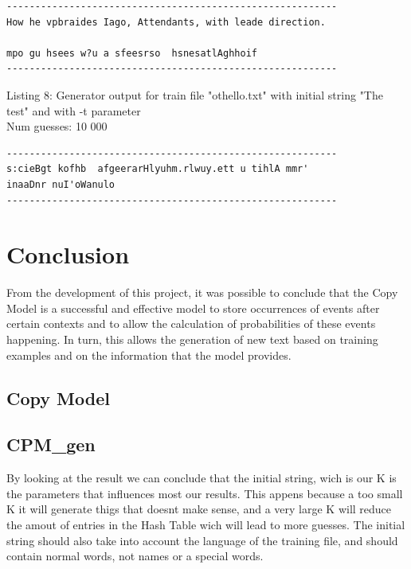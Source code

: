 \documentclass{article}
\begin{document}
\begin{lstlisting}
----------------------------------------------------------
How he vpbraides Iago, Attendants, with leade direction.

mpo gu hsees w?u a sfeesrso  hsnesatlAghhoif
----------------------------------------------------------
\end{lstlisting}

Listing 8: Generator output for train file "othello.txt" with initial string "The test" and with -t parameter
\\Num guesses: 10 000

\begin{lstlisting}
----------------------------------------------------------
s:cieBgt kofhb  afgeerarHlyuhm.rlwuy.ett u tihlA mmr'
inaaDnr nuI'oWanulo
----------------------------------------------------------
\end{lstlisting}

\section{Conclusion}
\label{sec:conclusion}

From the development of this project, it was possible to conclude that the Copy
Model is a successful and effective model to store occurrences of events after certain contexts
and to allow the calculation of probabilities of these events happening. In turn, this allows
the generation of new text based on training examples and on the information that the
model provides.

\subsection{Copy Model}

\subsection{CPM_gen}


By looking at the result we can conclude that the initial string, wich is our K is the parameters that influences most our results.
This appens because a too small K it will generate thigs that doesnt make sense, and a very large K will reduce the amout of entries 
in the Hash Table wich will lead to more guesses. The initial string should also take into account the language of the training file,
and should contain normal words, not names or a special words. 
\end{document}

